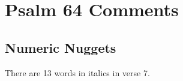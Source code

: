 \section{Psalm 64 Comments}

\subsection{Numeric  Nuggets}
There are 13 words in italics in verse 7. 